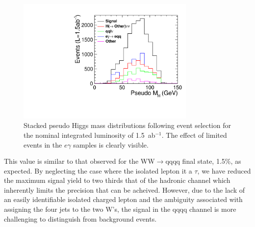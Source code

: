 \begin{figure}
  \centering
  \includegraphics[width=0.78\textwidth,keepaspectratio]{HiggsAnalysis/figures/PseudoHiggs_NotUnityAlt.pdf}
  \caption[Pseudo Higgs mass following event selection]{Stacked pseudo Higgs mass distributions following event selection for the nominal integrated luminosity of 1.5~ab$^{-1}$. The effect of limited events in the $e\gamma$ samples is clearly visible.}
  \label{fig:higgsmassAlt}
\end{figure}

This value is similar to that observed for the WW$\rightarrow$qqqq final state, 1.5\%, as expected. By neglecting the case where the isolated lepton it a $\tau$, we have reduced the maximum signal yield to two thirds that of the hadronic channel which inherently limits the precision that can be acheived. However, due to the lack of an easily identifiable isolated charged lepton and the ambiguity associated with assigning the four jets to the two W's, the signal in the qqqq channel is more challenging to distinguish from background events.

